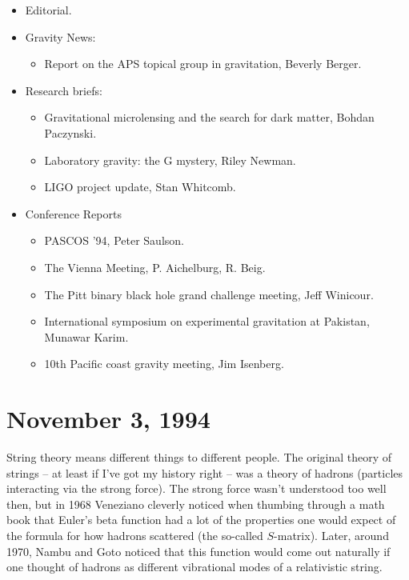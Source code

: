 \documentclass{article}
\def\tightlist{}
\begin{document}
\begin{itemize}
\tightlist
\item
  Editorial.
\item
  Gravity News:

  \begin{itemize}
  \tightlist
  \item
    Report on the APS topical group in gravitation, Beverly Berger.
  \end{itemize}
\item
  Research briefs:

  \begin{itemize}
  \tightlist
  \item
    Gravitational microlensing and the search for dark matter, Bohdan
    Paczynski.
  \item
    Laboratory gravity: the G mystery, Riley Newman.
  \item
    LIGO project update, Stan Whitcomb.
  \end{itemize}
\item
  Conference Reports

  \begin{itemize}
  \tightlist
  \item
    PASCOS '94, Peter Saulson.
  \item
    The Vienna Meeting, P. Aichelburg, R. Beig.
  \item
    The Pitt binary black hole grand challenge meeting, Jeff Winicour.
  \item
    International symposium on experimental gravitation at Pakistan,
    Munawar Karim.
  \item
    10th Pacific coast gravity meeting, Jim Isenberg.
  \end{itemize}
\end{itemize}



\hypertarget{week42}{%
\section{November 3, 1994}\label{week42}}

String theory means different things to different people. The original
theory of strings -- at least if I've got my history right -- was a
theory of hadrons (particles interacting via the strong force). The
strong force wasn't understood too well then, but in 1968 Veneziano
cleverly noticed when thumbing through a math book that Euler's beta
function had a lot of the properties one would expect of the formula for
how hadrons scattered (the so-called \(S\)-matrix). Later, around 1970,
Nambu and Goto noticed that this function would come out naturally if
one thought of hadrons as different vibrational modes of a relativistic
string.
\end{document}
